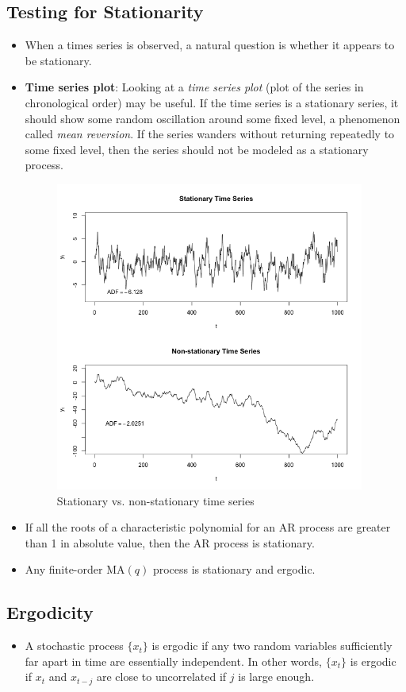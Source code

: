 \documentclass[11pt]{article}
\begin{document}
\subsection{Testing for Stationarity}
\begin{itemize}
    \item When a times series is observed, a natural question is whether it appears to be 
    stationary. 
    \item \textbf{Time series plot}:
    Looking at a \textit{time series plot} (plot of the series in chronological 
    order) may be useful. If the time series is a stationary series, it should show some random 
    oscillation around some fixed level, a phenomenon called \textit{mean reversion}. If the 
    series wanders without returning repeatedly to some fixed level, then the series should not
    be modeled as a stationary process. 
    \begin{figure}[H] 
         \centering 
         \includegraphics[width=4in]{imgs/stationary_vs_nonstationary.png}
         \caption{Stationary vs. non-stationary time series}
     \end{figure}
     \item If all the roots of a characteristic polynomial for an AR process are greater than 1 
     in absolute value, then the AR process is stationary.
     \item Any finite-order $\text{MA}(q)$ process is stationary and ergodic.
\end{itemize}

\subsection{Ergodicity}
\begin{itemize}
    \item A stochastic process $\{x_t\}$ is ergodic if any two random variables sufficiently 
    far apart in time are essentially independent. In other words, $\{x_t\}$ is ergodic if 
    $x_t$ and $x_{t-j}$ are close to uncorrelated if $j$ is large enough.
\end{itemize}
\end{document}
